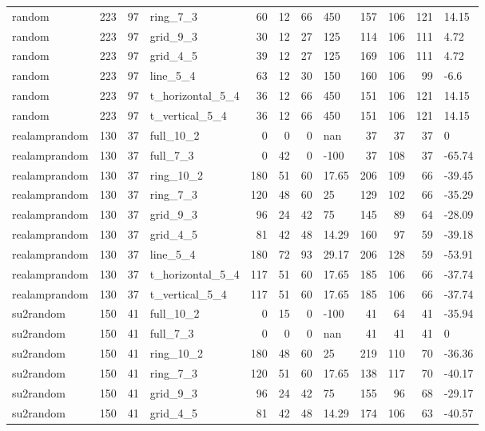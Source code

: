 \begin{longtable}{lrrlrrrlrrrl}
random & 223 & 97 & ring\_7\_3 & 60 & 12 & 66 & 450 & 157 & 106 & 121 & 14.15 \\
random & 223 & 97 & grid\_9\_3 & 30 & 12 & 27 & 125 & 114 & 106 & 111 & 4.72 \\
random & 223 & 97 & grid\_4\_5 & 39 & 12 & 27 & 125 & 169 & 106 & 111 & 4.72 \\
random & 223 & 97 & line\_5\_4 & 63 & 12 & 30 & 150 & 160 & 106 & 99 & -6.6 \\
random & 223 & 97 & t\_horizontal\_5\_4 & 36 & 12 & 66 & 450 & 151 & 106 & 121 & 14.15 \\
random & 223 & 97 & t\_vertical\_5\_4 & 36 & 12 & 66 & 450 & 151 & 106 & 121 & 14.15 \\
realamprandom & 130 & 37 & full\_10\_2 & 0 & 0 & 0 & nan & 37 & 37 & 37 & 0 \\
realamprandom & 130 & 37 & full\_7\_3 & 0 & 42 & 0 & -100 & 37 & 108 & 37 & -65.74 \\
realamprandom & 130 & 37 & ring\_10\_2 & 180 & 51 & 60 & 17.65 & 206 & 109 & 66 & -39.45 \\
realamprandom & 130 & 37 & ring\_7\_3 & 120 & 48 & 60 & 25 & 129 & 102 & 66 & -35.29 \\
realamprandom & 130 & 37 & grid\_9\_3 & 96 & 24 & 42 & 75 & 145 & 89 & 64 & -28.09 \\
realamprandom & 130 & 37 & grid\_4\_5 & 81 & 42 & 48 & 14.29 & 160 & 97 & 59 & -39.18 \\
realamprandom & 130 & 37 & line\_5\_4 & 180 & 72 & 93 & 29.17 & 206 & 128 & 59 & -53.91 \\
realamprandom & 130 & 37 & t\_horizontal\_5\_4 & 117 & 51 & 60 & 17.65 & 185 & 106 & 66 & -37.74 \\
realamprandom & 130 & 37 & t\_vertical\_5\_4 & 117 & 51 & 60 & 17.65 & 185 & 106 & 66 & -37.74 \\
su2random & 150 & 41 & full\_10\_2 & 0 & 15 & 0 & -100 & 41 & 64 & 41 & -35.94 \\
su2random & 150 & 41 & full\_7\_3 & 0 & 0 & 0 & nan & 41 & 41 & 41 & 0 \\
su2random & 150 & 41 & ring\_10\_2 & 180 & 48 & 60 & 25 & 219 & 110 & 70 & -36.36 \\
su2random & 150 & 41 & ring\_7\_3 & 120 & 51 & 60 & 17.65 & 138 & 117 & 70 & -40.17 \\
su2random & 150 & 41 & grid\_9\_3 & 96 & 24 & 42 & 75 & 155 & 96 & 68 & -29.17 \\
su2random & 150 & 41 & grid\_4\_5 & 81 & 42 & 48 & 14.29 & 174 & 106 & 63 & -40.57 \\

\end{longtable}
